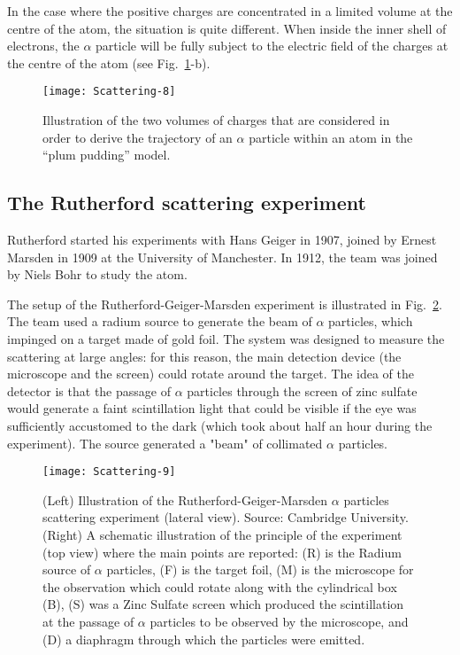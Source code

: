 In the case where the positive charges are concentrated in a limited volume at the centre of the atom, the situation is quite different. When inside the inner shell of electrons, the $\alpha$ particle will be fully subject to the electric field of the charges at the centre of the atom (see Fig.~\ref{fig:gauss}-b).

\begin{figure}
    \centering
    \texttt{[image: Scattering-8]}
    \caption{Illustration of the two volumes of charges that are considered in order to derive the trajectory of an $\alpha$ particle within an atom in the ``plum pudding'' model.}
    \label{fig:gauss}
\end{figure}{}

\subsection{The Rutherford scattering experiment}

Rutherford started his experiments with Hans Geiger in 1907, joined by Ernest Marsden in 1909 at the University of Manchester. In 1912, the team was joined by Niels Bohr to study the atom.

The setup of the Rutherford-Geiger-Marsden experiment is illustrated in Fig.~\ref{fig:geiger-marsden}. The team used a radium source to generate the beam of $\alpha$ particles, which impinged on a target made of gold foil. The system was designed to measure the scattering at large angles: for this reason, the main detection device (the microscope and the screen) could rotate around the target. The idea of the detector is that the passage of $\alpha$ particles through the screen of zinc sulfate would generate a faint scintillation light that could be visible if the eye was sufficiently accustomed to the dark (which took about half an hour during the experiment). The source generated a "beam" of collimated $\alpha$ particles. 

\begin{figure}
    \centering
    \texttt{[image: Scattering-9]}
    \caption{(Left) Illustration of the Rutherford-Geiger-Marsden $\alpha$ particles scattering experiment (lateral view). Source: Cambridge University. (Right) A schematic illustration of the principle of the experiment (top view) where the main points are reported:  (R) is the Radium source of $\alpha$ particles, (F) is the target foil, (M) is the microscope for the observation which could rotate along with the cylindrical box (B), (S) was a Zinc Sulfate screen which produced the scintillation at the passage of $\alpha$ particles to be observed by the microscope, and (D) a diaphragm through which the particles were emitted. }
    \label{fig:geiger-marsden}
\end{figure}{}

